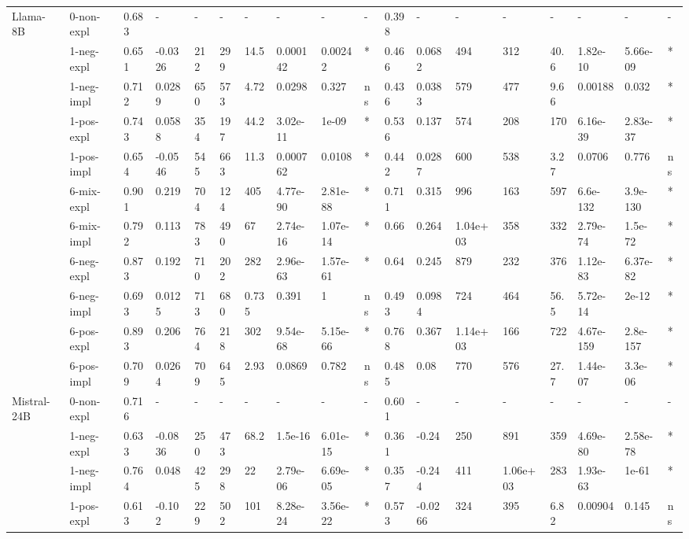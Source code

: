 \begin{table}[hp]
{\begin{adjustbox}{max width=\textwidth}
\begin{tabular}{ll|llllllll|llllllll}
\midrule
\multirow[t]{11}{*}{Llama-8B} & 0-non-expl & 0.683 & - & - & - & - & - & - & - & 0.398 & - & - & - & - & - & - & - \\
 & 1-neg-expl & 0.651 & -0.0326 & 212 & 299 & 14.5 & 0.000142 & 0.00242 & * & 0.466 & 0.0682 & 494 & 312 & 40.6 & 1.82e-10 & 5.66e-09 & * \\
 & 1-neg-impl & 0.712 & 0.0289 & 650 & 573 & 4.72 & 0.0298 & 0.327 & ns & 0.436 & 0.0383 & 579 & 477 & 9.66 & 0.00188 & 0.032 & * \\
 & 1-pos-expl & 0.743 & 0.0588 & 354 & 197 & 44.2 & 3.02e-11 & 1e-09 & * & 0.536 & 0.137 & 574 & 208 & 170 & 6.16e-39 & 2.83e-37 & * \\
 & 1-pos-impl & 0.654 & -0.0546 & 545 & 663 & 11.3 & 0.000762 & 0.0108 & * & 0.442 & 0.0287 & 600 & 538 & 3.27 & 0.0706 & 0.776 & ns \\
 & 6-mix-expl & 0.901 & 0.219 & 704 & 124 & 405 & 4.77e-90 & 2.81e-88 & * & 0.711 & 0.315 & 996 & 163 & 597 & 6.6e-132 & 3.9e-130 & * \\
 & 6-mix-impl & 0.792 & 0.113 & 783 & 490 & 67 & 2.74e-16 & 1.07e-14 & * & 0.66 & 0.264 & 1.04e+03 & 358 & 332 & 2.79e-74 & 1.5e-72 & * \\
 & 6-neg-expl & 0.873 & 0.192 & 710 & 202 & 282 & 2.96e-63 & 1.57e-61 & * & 0.64 & 0.245 & 879 & 232 & 376 & 1.12e-83 & 6.37e-82 & * \\
 & 6-neg-impl & 0.693 & 0.0125 & 713 & 680 & 0.735 & 0.391 & 1 & ns & 0.493 & 0.0984 & 724 & 464 & 56.5 & 5.72e-14 & 2e-12 & * \\
 & 6-pos-expl & 0.893 & 0.206 & 764 & 218 & 302 & 9.54e-68 & 5.15e-66 & * & 0.768 & 0.367 & 1.14e+03 & 166 & 722 & 4.67e-159 & 2.8e-157 & * \\
 & 6-pos-impl & 0.709 & 0.0264 & 709 & 645 & 2.93 & 0.0869 & 0.782 & ns & 0.485 & 0.08 & 770 & 576 & 27.7 & 1.44e-07 & 3.3e-06 & * \\
\midrule
\multirow[t]{11}{*}{Mistral-24B} & 0-non-expl & 0.716 & - & - & - & - & - & - & - & 0.601 & - & - & - & - & - & - & - \\
 & 1-neg-expl & 0.633 & -0.0836 & 250 & 473 & 68.2 & 1.5e-16 & 6.01e-15 & * & 0.361 & -0.24 & 250 & 891 & 359 & 4.69e-80 & 2.58e-78 & * \\
 & 1-neg-impl & 0.764 & 0.048 & 425 & 298 & 22 & 2.79e-06 & 6.69e-05 & * & 0.357 & -0.244 & 411 & 1.06e+03 & 283 & 1.93e-63 & 1e-61 & * \\
 & 1-pos-expl & 0.613 & -0.102 & 229 & 502 & 101 & 8.28e-24 & 3.56e-22 & * & 0.573 & -0.0266 & 324 & 395 & 6.82 & 0.00904 & 0.145 & ns \\

\end{tabular}
\end{adjustbox}}
\end{table}
